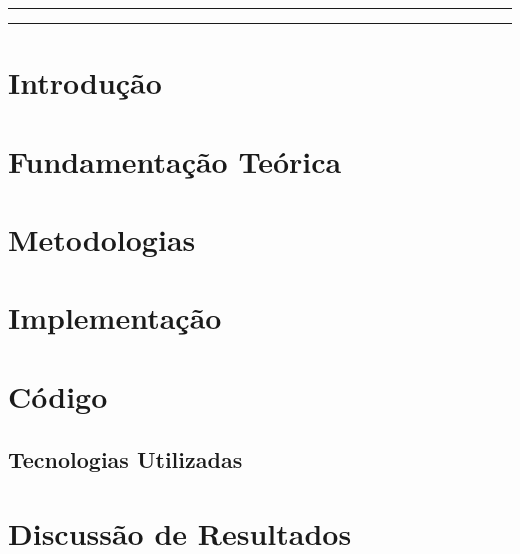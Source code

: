 \documentclass[12pt,a4paper,twoside]{article}
\author[1]{Eduardo}
\author[2]{Jéferson}
\author[3]{leicimara}
\affil[1]{Centro Universitario Atenas.}
\begin{document}
\maketitle

\thispagestyle{capa}


\hrule

\begin{abstract}
\noindent
\vspace{2\baselineskip}
\end{abstract}
\vspace{5mm}

\hrule


\section{Introdução}
    

\section{Fundamentação Teórica}
    

\section{Metodologias}
    

\section{Implementação}
    

\section{Código}
    

\subsection{Tecnologias Utilizadas}
    

\section{Discussão de Resultados}
    
\end{document}
